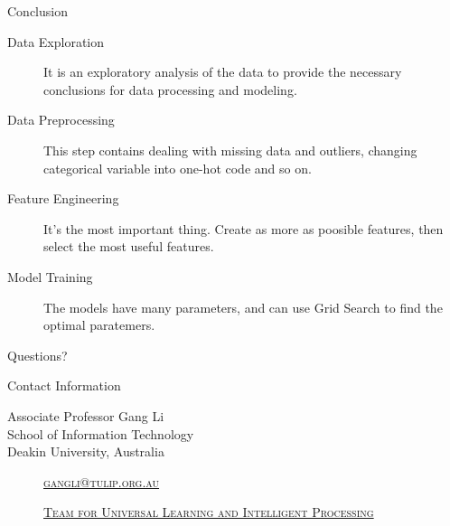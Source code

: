 \documentclass[
 size=14pt,
 paper=smartboard,  %
 mode=present, 		%
 display=slides, 	%
 style=tuliplab,  	%
 pauseslide,
 fleqn,leqno]{powerdot}
\begin{document}
\begin{slide}[toc=,bm=]{Conclusion}
\begin{description}
	\item[Data Exploration] It is an 
	exploratory analysis of the data to 
	provide the necessary conclusions 
	for data processing and modeling.
	\item[Data Preprocessing] This step contains
	dealing with missing data and outliers,
	changing categorical variable 
	into one-hot code and so on.
	\item[Feature Engineering] It's the 
	most important thing.
	Create as more as poosible features,
	then select the most useful features.
	\item[Model Training] The models have 
	many parameters,
	and can use Grid Search to find 
	the optimal paratemers.	
\end{description}



\end{slide}


%
\begin{slide}[toc=,bm=]{Questions?}
\begin{center}
\begin{figure}
\end{figure}
\end{center}
\end{slide}


\begin{wideslide}[toc=,bm=]{Contact Information}
\centering
{}
\twocolumn[
lcolwidth=0.35\linewidth,
rcolwidth=0.65\linewidth
]
{
}
{
Associate Professor Gang Li\\
School of Information Technology\\
Deakin University, Australia
\begin{description}
 \item[\textcolor{orange}{\faEnvelope}] \href{mailto:gangli@tulip.org.au}
 {\textsc{\footnotesize{gangli@tulip.org.au}}}

 \item[\textcolor{orange}{\faHome}] \href{http://www.tulip.org.au}
 {\textsc{\footnotesize{Team for Universal Learning and Intelligent Processing}}}
\end{description}
}
\end{wideslide}
\end{document}
